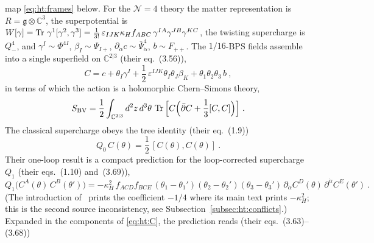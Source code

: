map \eqref{eq:ht:frames} below. For the $\mathcal N=4$ theory the matter
representation is $R=\mathfrak g\otimes\mathbb C^{3}$, the superpotential is
$W[\gamma]=\operatorname{Tr}\,\gamma^{1}[\gamma^{2},\gamma^{3}]
=\frac{1}{3!}\,\varepsilon_{IJK}\kappa_{H}f_{ABC}\,
\gamma^{IA}\gamma^{JB}\gamma^{KC}$, the twisting supercharge is $Q^{4}_{-}$,
and $\gamma^{I}\sim\Phi^{4I}$, $\beta_{I}\sim\Psi_{I+}$,
$\partial_{\dot\alpha}c\sim\bar\Psi^{4}_{\dot\alpha}$, $b\sim F_{++}$. The
$1/16$-BPS fields assemble into a single superfield on $\mathbb C^{2|3}$
(their eq.~(3.56)),
\begin{equation}\label{eq:ht:C}
C=c+\theta_{I}\gamma^{I}
+\frac12\,\varepsilon^{IJK}\theta_{I}\theta_{J}\beta_{K}
+\theta_{1}\theta_{2}\theta_{3}\,b \ ,
\end{equation}
in terms of which the action is a holomorphic Chern--Simons theory,
\begin{equation}\label{eq:ht:hcs}
S_{\mathrm{BV}}=\frac12\int_{\mathbb C^{2|3}}d^{2}z\,d^{3}\theta\,
\operatorname{Tr}\Big[C\Big(\bar\partial C+\frac13[C,C]\Big)\Big] \ .
\end{equation}
The classical supercharge obeys the tree identity (their eq.~(1.9))
\begin{equation}\label{eq:ht:Q0C}
Q_{0}\,C(\theta)=\frac12\,[C(\theta),C(\theta)] \ .
\end{equation}
Their one-loop result is a compact prediction for the loop-corrected
supercharge $Q_{1}$ (their eqs.~(1.10) and~(3.69)),
\begin{equation}\label{eq:ht:Q1C}
Q_{1}\big(C^{A}(\theta)\,C^{B}(\theta')\big)
=-\kappa_{H}^{2}\,f_{ACD}f_{BCE}\,
(\theta_{1}-\theta_{1}')(\theta_{2}-\theta_{2}')(\theta_{3}-\theta_{3}')\,
\partial_{\dot\alpha}C^{D}(\theta)\,
\partial^{\dot\alpha}C^{E}(\theta') \ .
\end{equation}
(The introduction of~\cite{BK} prints the coefficient $-1/4$ where its main
text prints $-\kappa_{H}^{2}$; this is the second source inconsistency, see
Subsection~\ref{subsec:ht:conflicts}.) Expanded in the components of
\eqref{eq:ht:C}, the prediction reads (their eqs.~(3.63)--(3.68))
